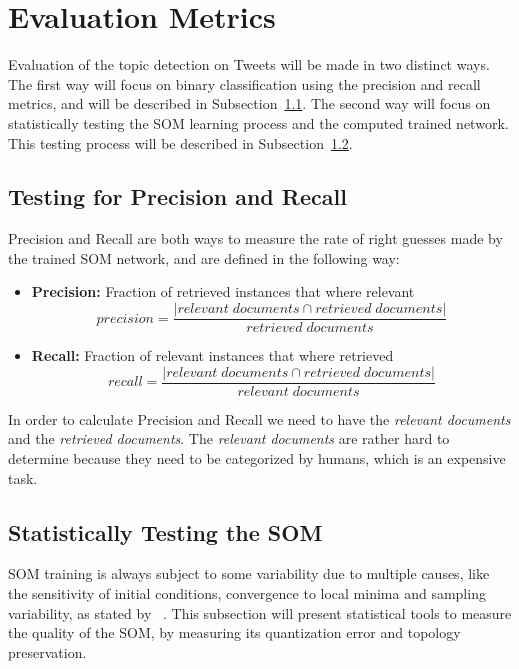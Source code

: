 
\section{Evaluation Metrics} 
\label{sec:evaluation_metrics}
Evaluation of the topic detection on Tweets will be made in two distinct ways. The first way will focus on  binary classification using the precision and recall metrics, and will be described in Subsection~\ref{sub:testing_for_precision_and_recall}. The second way will focus on statistically testing the SOM learning process and the computed trained network. This testing process will be described in Subsection~\ref{sub:cluster_quality_testing}. 

\subsection{Testing for Precision and Recall} 
\label{sub:testing_for_precision_and_recall}
Precision and Recall are both ways to measure the rate of right guesses made by the trained SOM network, and are defined in the following way:
\begin{itemize}
  \item \textbf{Precision:} Fraction of retrieved instances that where relevant 
    \begin{equation}
      precision = \frac{|{relevant\;documents}\cap{retrieved\;documents}|}{{retrieved\;documents}}
    \end{equation} 
  \item \textbf{Recall:} Fraction of relevant instances that where retrieved
   \begin{equation}
      recall = \frac{|{relevant\;documents}\cap{retrieved\;documents}|}{{relevant\;documents}} 
    \end{equation} 
\end{itemize}

In order to calculate Precision and Recall we need to have the \emph{relevant documents} and the \emph{retrieved documents}. The \emph{relevant documents} are rather hard to determine because they need to be categorized by humans, which is an expensive task.

\subsection{Statistically Testing the SOM} 
\label{sub:cluster_quality_testing}
SOM training is always subject to some variability due to multiple causes, like the sensitivity of initial conditions, convergence to local minima and sampling variability, as stated by ~\citet{Bodt}. This subsection will present statistical tools to measure the quality of the SOM, by measuring its quantization error and topology preservation.

